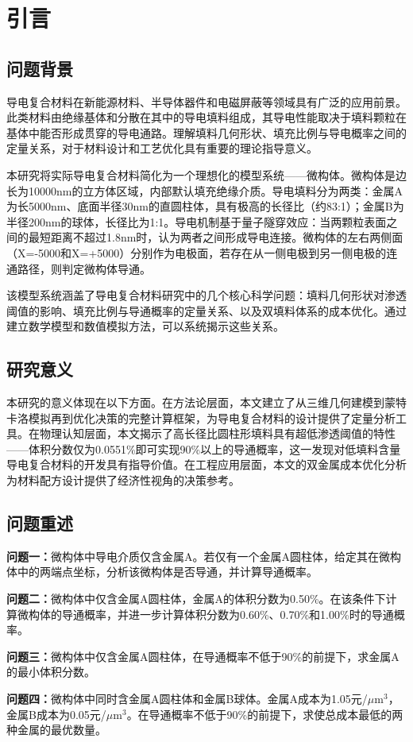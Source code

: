 
\section{引言}
\subsection{问题背景}

导电复合材料在新能源材料、半导体器件和电磁屏蔽等领域具有广泛的应用前景。此类材料由绝缘基体和分散在其中的导电填料组成，其导电性能取决于填料颗粒在基体中能否形成贯穿的导电通路。理解填料几何形状、填充比例与导电概率之间的定量关系，对于材料设计和工艺优化具有重要的理论指导意义。

本研究将实际导电复合材料简化为一个理想化的模型系统——微构体。微构体是边长为10000nm的立方体区域，内部默认填充绝缘介质。导电填料分为两类：金属A为长5000nm、底面半径30nm的直圆柱体，具有极高的长径比（约83:1）；金属B为半径200nm的球体，长径比为1:1。导电机制基于量子隧穿效应：当两颗粒表面之间的最短距离不超过1.8nm时，认为两者之间形成导电连接。微构体的左右两侧面（X=-5000和X=+5000）分别作为电极面，若存在从一侧电极到另一侧电极的连通路径，则判定微构体导通。

该模型系统涵盖了导电复合材料研究中的几个核心科学问题：填料几何形状对渗透阈值的影响、填充比例与导通概率的定量关系、以及双填料体系的成本优化。通过建立数学模型和数值模拟方法，可以系统揭示这些关系。

\subsection{研究意义}

本研究的意义体现在以下方面。在方法论层面，本文建立了从三维几何建模到蒙特卡洛模拟再到优化决策的完整计算框架，为导电复合材料的设计提供了定量分析工具。在物理认知层面，本文揭示了高长径比圆柱形填料具有超低渗透阈值的特性——体积分数仅为0.0551\%即可实现90\%以上的导通概率，这一发现对低填料含量导电复合材料的开发具有指导价值。在工程应用层面，本文的双金属成本优化分析为材料配方设计提供了经济性视角的决策参考。

\subsection{问题重述}

\textbf{问题一：}微构体中导电介质仅含金属A。若仅有一个金属A圆柱体，给定其在微构体中的两端点坐标，分析该微构体是否导通，并计算导通概率。

\textbf{问题二：}微构体中仅含金属A圆柱体，金属A的体积分数为0.50\%。在该条件下计算微构体的导通概率，并进一步计算体积分数为0.60\%、0.70\%和1.00\%时的导通概率。

\textbf{问题三：}微构体中仅含金属A圆柱体，在导通概率不低于90\%的前提下，求金属A的最小体积分数。

\textbf{问题四：}微构体中同时含金属A圆柱体和金属B球体。金属A成本为1.05元/$\mu$m$^3$，金属B成本为0.05元/$\mu$m$^3$。在导通概率不低于90\%的前提下，求使总成本最低的两种金属的最优数量。
